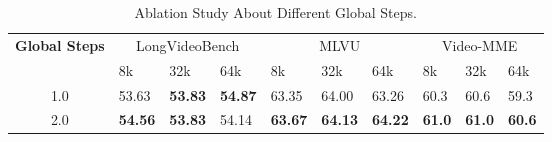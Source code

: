 \renewcommand{\arraystretch}{1.1}
\begin{table*}[!h]
\setlength\tabcolsep{12pt}
\centering
\caption {Ablation Study About Different Global Steps.
}\label{tab:ablation_global_steps}
\vspace{2mm}
\footnotesize
\begin{tabular}{clllllllll}
\hline
\multirow{2}{*}{\textbf{Global Steps}}  & \multicolumn{3}{c}{LongVideoBench} & \multicolumn{3}{c}{MLVU} & \multicolumn{3}{c}{Video-MME} \\
\cmidrule(lr){2-4} %
\cmidrule(lr){5-7} %
\cmidrule(lr){8-10} %
 & 8k & 32k & 64k & 8k & 32k & 64k & 8k & 32k & 64k \\ \hline
1.0 & 53.63 & \textbf{53.83} & \textbf{54.87} & 63.35 & 64.00 & 63.26 & 60.3 & 60.6 & 59.3 \\
2.0 & \textbf{54.56} & \textbf{53.83} & 54.14 & \textbf{63.67} & \textbf{64.13} & \textbf{64.22} & \textbf{61.0} & \textbf{61.0} & \textbf{60.6} \\ \hline
\end{tabular}

\end{table*}